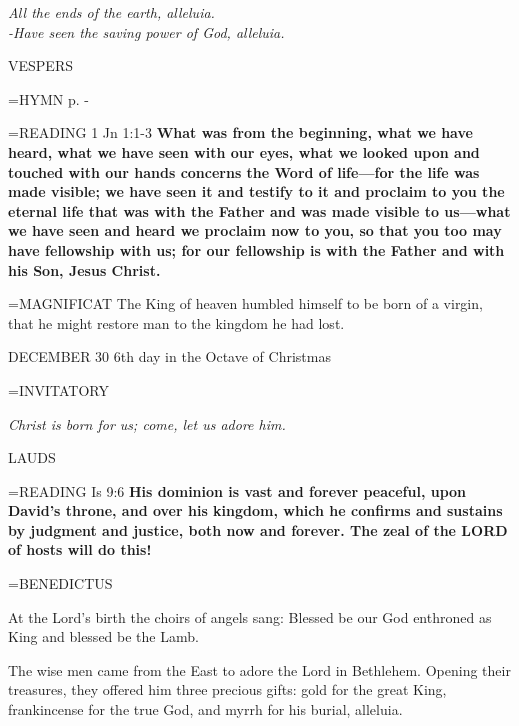 \begin{center}
\textit{All the ends of the earth, alleluia.\\
-Have seen the saving power of God, alleluia.}
\end{center}

\begin{flushleft}\normalsize VESPERS\\\end{flushleft}

\hangindent=\parindent \small{\uppercase{HYMN} p. \pageref{christmas:firstHymn}-\pageref{christmas:lastHymn}\\}

\hangindent=\parindent \small{\uppercase{READING}}    1 Jn 1:1-3 \textbf{   What was from the beginning, what we have heard, what we have seen with our eyes, what we looked upon and touched with our hands concerns the Word of life—for the life was made visible; we have seen it and testify to it and proclaim to you the eternal life that was with the Father and was made visible to us—what we have seen and heard we proclaim now to you, so that you too may have fellowship with us; for our fellowship is with the Father and with his Son, Jesus Christ.\\}

\hangindent=\parindent \small{MAGNIFICAT 	The King of heaven humbled himself to be born of a virgin, that he might restore man to the kingdom he had lost.\\}

DECEMBER 30
6th day in the Octave of Christmas

\hangindent=\parindent \small{INVITATORY	}
\begin{center}
\textit{Christ is born for us; come, let us adore him.\\}
\end{center}

\begin{flushleft}\normalsize LAUDS\\\end{flushleft}

\hangindent=\parindent \small{\uppercase{READING}}    Is 9:6 \textbf{   His dominion is vast and forever peaceful, upon David’s throne, and over his kingdom, which he confirms and sustains by judgment and justice, both now and forever. The zeal of the LORD of hosts will do this!\\}

\hangindent=\parindent \small BENEDICTUS 
\begin{description}[labelindent=\parindent, leftmargin=*]
\item [(before Epiphany):]  At the Lord's birth the choirs of angels sang: Blessed be our God enthroned as King and blessed be the Lamb.
\item [(Monday after Epiphany):]  The wise men came from the East to adore the Lord in Bethlehem. Opening their treasures, they offered him three precious gifts: gold for the great King, frankincense for the true God, and myrrh for his burial, alleluia.
\end{description}


